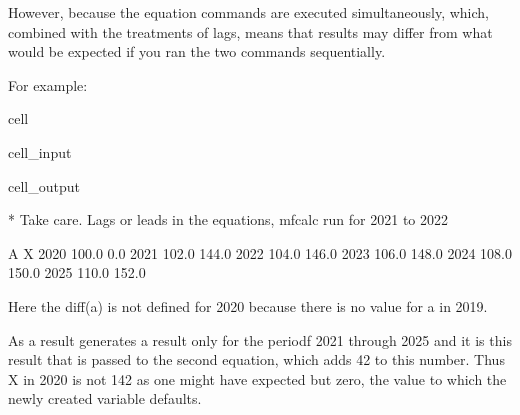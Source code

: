 \documentclass[letterpaper,10pt,english]{jupyterBook}
\begin{document}
\sphinxAtStartPar
However,  because the equation commands are executed simultaneously, which, combined with the treatments of lags, means that results may differ from what would be expected if you ran the two commands sequentially.

\sphinxAtStartPar
For example:

\begin{sphinxuseclass}{cell}\begin{sphinxVerbatimInput}

\begin{sphinxuseclass}{cell_input}
\begin{sphinxVerbatim}[commandchars=\\\{\}]
  


\end{sphinxVerbatim}

\end{sphinxuseclass}\end{sphinxVerbatimInput}
\begin{sphinxVerbatimOutput}

\begin{sphinxuseclass}{cell_output}
\begin{sphinxVerbatim}[commandchars=\\\{\}]
* Take care. Lags or leads in the equations, mfcalc run for 2021 to 2022
\end{sphinxVerbatim}

\begin{sphinxVerbatim}[commandchars=\\\{\}]
          A      X
2020  100.0    0.0
2021  102.0  144.0
2022  104.0  146.0
2023  106.0  148.0
2024  108.0  150.0
2025  110.0  152.0
\end{sphinxVerbatim}

\end{sphinxuseclass}\end{sphinxVerbatimOutput}

\end{sphinxuseclass}
\sphinxAtStartPar
Here the diff(a) is not defined for 2020 because there is no value for a in 2019.

\sphinxAtStartPar
As a result  generates a result only for the periodf 2021 through 2025 and it is this result that is passed to the second equation, which adds 42 to this number. Thus X in 2020 is not 142 as one might have expected but zero, the value to which the newly created variable defaults.
\end{document}
